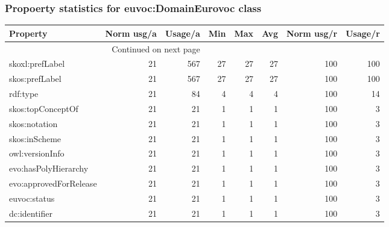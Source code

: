 \documentclass[10pt,a4paper,titlepage,final]{article}
\begin{document}
\subsubsection{Propoerty statistics for euvoc:DomainEurovoc class}
\begin{longtable}{lrrrrrrr}
\toprule
               Property &  Norm usg/a &  Usage/a &  Min &  Max &  Avg &  Norm usg/r &  Usage/r \\
\midrule
\endhead
\midrule
\multicolumn{3}{r}{{Continued on next page}} \\
\midrule
\endfoot

\bottomrule
\endlastfoot
        skoxl:prefLabel &          21 &      567 &   27 &   27 &   27 &         100 &      100 \\
         skos:prefLabel &          21 &      567 &   27 &   27 &   27 &         100 &      100 \\
               rdf:type &          21 &       84 &    4 &    4 &    4 &         100 &       14 \\
      skos:topConceptOf &          21 &       21 &    1 &    1 &    1 &         100 &        3 \\
          skos:notation &          21 &       21 &    1 &    1 &    1 &         100 &        3 \\
          skos:inScheme &          21 &       21 &    1 &    1 &    1 &         100 &        3 \\
        owl:versionInfo &          21 &       21 &    1 &    1 &    1 &         100 &        3 \\
   evo:hasPolyHierarchy &          21 &       21 &    1 &    1 &    1 &         100 &        3 \\
 evo:approvedForRelease &          21 &       21 &    1 &    1 &    1 &         100 &        3 \\
           euvoc:status &          21 &       21 &    1 &    1 &    1 &         100 &        3 \\
          dc:identifier &          21 &       21 &    1 &    1 &    1 &         100 &        3 \\
\end{longtable}
\end{document}
